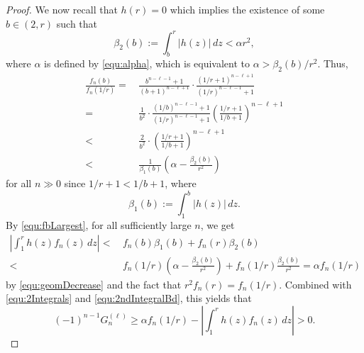 \documentclass[10pt,a4paper]{amsart}
\begin{document}
\begin{proof}
We now recall that $h(r)=0$ which implies the existence of some $b\in (2,r)$ such that
\begin{equation*}
\beta_2 (b):= \int_b^r | h(z)| \, dz < \alpha r^2,
\end{equation*}
where $\alpha$ is defined by \eqref{equ:alpha}, which is equivalent to  $\alpha>\beta_2 (b)/r^2$.
Thus,
\begin{align}
\frac {f_n(b)}{f_n(1/r)}=&\, \frac{b^{n-\ell-1}+1}{(b+1)^{n-\ell+1}}\cdot\frac{ (1/r+1)^{n-\ell+1}}{(1/r)^{n-\ell-1}+1}\nonumber\\
=&\, \frac{1}{b^2}  \cdot \frac{(1/b)^{n-\ell-1}+1}{(1/r)^{n-\ell-1}+1} \left(\frac{1/r+1}{1/b+1}\right)^{n-\ell+1}\nonumber\\
<&\,  \frac{2}{b^2}\cdot \left(\frac{1/r+1}{1/b+1}\right)^{n-\ell+1}\nonumber\\
<&\,  \frac{1}{\beta_1 (b)}\left(\alpha-\frac{\beta_2 (b) }{r^2}\right)   \label{equ:geomDecrease}
\end{align}
for all $n\gg 0$ since $1/r+1<1/b+1$, where
\begin{equation*}
\beta_1 (b):= \int_1^b | h(z)| \, dz.
\end{equation*}
By \eqref{equ:fbLargest}, for all sufficiently large $n$, we get
\begin{align*}
\left| \int_1^r h(z) f_n(z)\, dz \right|
< &\,    f_n(b)\beta_1 (b) +  f_n(r)\beta_2 (b) \\
< &\, f_n(1/r) \left(\alpha-\frac{\beta_2 (b)}{r^2} \right)+  f_n(1/r) \frac{\beta_2 (b)}{r^2}
=\alpha f_n(1/r)
\end{align*}
by \eqref{equ:geomDecrease} and the fact that $r^2f_n(r) =f_n(1/r)$.
Combined with \eqref{equ:2Integrals} and \eqref{equ:2ndIntegralBd}, this yields that
\begin{equation}\label{equ:goal}
(-1)^{n-1} G_n^{(\ell)} \ge \alpha f_n(1/r)- \left| \int_1^r h(z) f_n(z)\, dz \right|>0.
\end{equation}



\end{proof}
\end{document}
